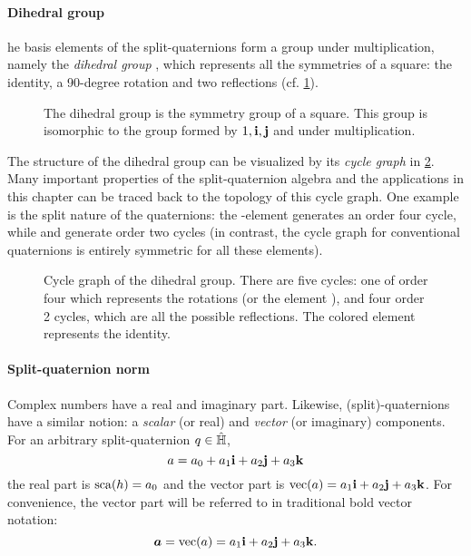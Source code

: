 \paragraph{Dihedral group} he basis elements of the split-quaternions form a group under multiplication, namely the \emph{dihedral group} , which represents all the symmetries of a square: the identity, a 90-degree rotation and two reflections (cf. \cref{fig:square_symmetry}).
\begin{figure}[h!]
    \centering
    
    \caption{The dihedral group  is the symmetry group of a square. This group is isomorphic to the group formed by $1, \vb{i}, \vb{j}$ and \quatk under multiplication.}
    \label{fig:square_symmetry}
\end{figure}

The structure of the dihedral group can be visualized by its \emph{cycle graph} in \cref{fig:cycle_graph}. Many important properties of the split-quaternion algebra and the applications in this chapter can be traced back to the topology of this cycle graph. One example is the split nature of the quaternions: the \quati-element generates an order four cycle, while \quatj and \quatk generate order two cycles (in contrast, the cycle graph for conventional quaternions is entirely symmetric for all these elements).
\begin{figure}[h!]
    \centering
    
    \caption{Cycle graph of the dihedral group. There are five cycles: one of order four which represents the rotations (or the element \quati), and four order 2 cycles, which are all the possible reflections. The colored element represents the identity.}
    \label{fig:cycle_graph}
\end{figure}

\paragraph{Split-quaternion norm} Complex numbers have a real and imaginary part. Likewise, (split)-quaternions have a similar notion: a \emph{scalar} (or real) and \emph{vector} (or imaginary) components. For an arbitrary split-quaternion $q \in \hat{\mathbb{H}}$, \cite{Jafari2014}
$$ a = a_0 + a_1\vb{i} + a_2\vb{j} + a_3\vb{k} $$
the real part is $\mathrm{sca}\qty(h) = a_0$ and the vector part is $ \mathrm{vec}\qty(a) = a_1\vb{i} + a_2\vb{j} + a_3\vb{k}$. For convenience, the vector part will be referred to in traditional bold vector notation:
$$ \vec{a} = \vecpart{a} = \quatvec{a_1}{a_2}{a_3}. $$

